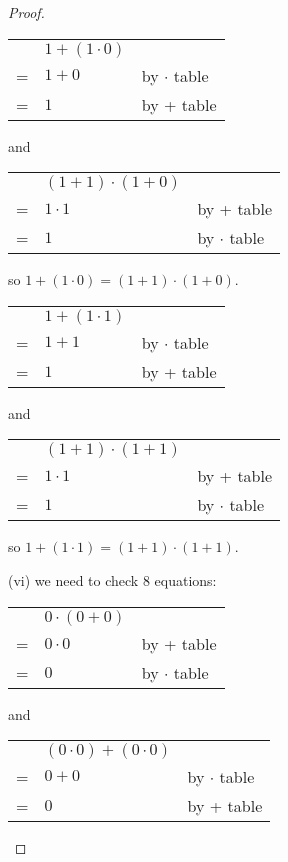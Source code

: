 \documentclass[14pt]{extarticle}
\newcommand{\cy}{\color{cyan}}
\begin{document}
\begin{proof}
  \begin{tabular}{cll}
      & \(1 + (1 \cdot 0)\) &                        \\
    = & \(1 + 0\)           & {\cy by $\cdot$ table} \\
    = & \(1\)               & {\cy by + table}
  \end{tabular}
  and
  \begin{tabular}{cll}
      & \((1 + 1) \cdot (1 + 0)\) &                        \\
    = & \(1 \cdot 1\)             & {\cy by + table}       \\
    = & \(1\)                     & {\cy by $\cdot$ table}
  \end{tabular}

  so \(1 + (1 \cdot 0) = (1 + 1) \cdot (1 + 0)\).

  \begin{tabular}{cll}
      & \(1 + (1 \cdot 1)\) &                        \\
    = & \(1 + 1\)           & {\cy by $\cdot$ table} \\
    = & \(1\)               & {\cy by + table}
  \end{tabular}
  and
  \begin{tabular}{cll}
      & \((1 + 1) \cdot (1 + 1)\) &                        \\
    = & \(1 \cdot 1\)             & {\cy by + table}       \\
    = & \(1\)                     & {\cy by $\cdot$ table}
  \end{tabular}

  so \(1 + (1 \cdot 1) = (1 + 1) \cdot (1 + 1)\).

  (vi) we need to check 8 equations:

  \begin{tabular}{cll}
      & \(0 \cdot (0 + 0)\) &                        \\
    = & \(0 \cdot 0\)       & {\cy by + table}       \\
    = & \(0\)               & {\cy by $\cdot$ table}
  \end{tabular}
  and
  \begin{tabular}{cll}
      & \((0 \cdot 0) + (0 \cdot 0)\) &                        \\
    = & \(0 + 0\)                     & {\cy by $\cdot$ table} \\
    = & \(0\)                         & {\cy by + table}
  \end{tabular}


\end{proof}
\end{document}
